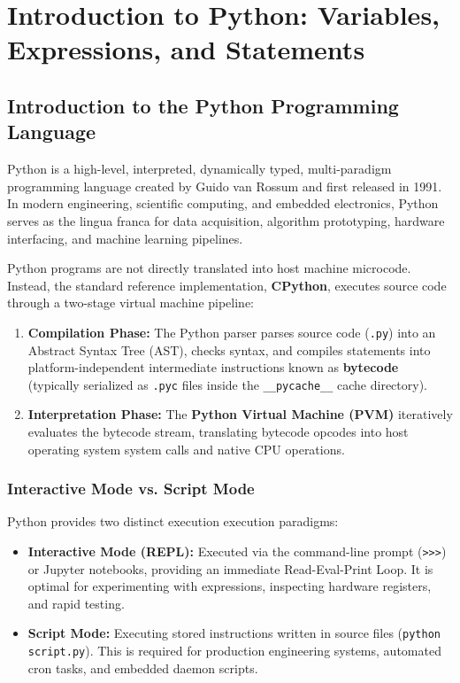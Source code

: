 \chapter{Introduction to Python: Variables, Expressions, and Statements}
\label{ch:python_basics}

\section{Introduction to the Python Programming Language}

Python is a high-level, interpreted, dynamically typed, multi-paradigm programming language created by Guido van Rossum and first released in 1991. In modern engineering, scientific computing, and embedded electronics, Python serves as the lingua franca for data acquisition, algorithm prototyping, hardware interfacing, and machine learning pipelines.

\begin{definition}
Python programs are not directly translated into host machine microcode. Instead, the standard reference implementation, \textbf{CPython}, executes source code through a two-stage virtual machine pipeline:
\begin{enumerate}[leftmargin=1.8em, itemsep=3pt]
    \item \textbf{Compilation Phase:} The Python parser parses source code (\texttt{.py}) into an Abstract Syntax Tree (AST), checks syntax, and compiles statements into platform-independent intermediate instructions known as \textbf{bytecode} (typically serialized as \texttt{.pyc} files inside the \texttt{\_\_pycache\_\_} cache directory).
    \item \textbf{Interpretation Phase:} The \textbf{Python Virtual Machine (PVM)} iteratively evaluates the bytecode stream, translating bytecode opcodes into host operating system system calls and native CPU operations.
\end{enumerate}
\end{definition}

\subsection{Interactive Mode vs. Script Mode}
Python provides two distinct execution execution paradigms:
\begin{itemize}[leftmargin=1.8em, itemsep=3pt]
    \item \textbf{Interactive Mode (REPL):} Executed via the command-line prompt (\texttt{>>>}) or Jupyter notebooks, providing an immediate Read-Eval-Print Loop. It is optimal for experimenting with expressions, inspecting hardware registers, and rapid testing.
    \item \textbf{Script Mode:} Executing stored instructions written in source files (\texttt{python script.py}). This is required for production engineering systems, automated cron tasks, and embedded daemon scripts.
\end{itemize}


